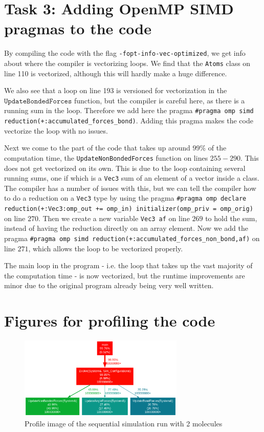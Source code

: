 \documentclass{article}
\begin{document}
\section{Task 3: Adding OpenMP SIMD pragmas to the code}
By compiling the code with the flag \texttt{-fopt-info-vec-optimized}, we get info about where the compiler is vectorizing loops. We find that the \texttt{Atoms} class on line 110 is vectorized, although this will hardly make a huge difference. 

We also see that a loop on line 193 is versioned for vectorization in the $\texttt{UpdateBondedForces}$ function, but the compiler is careful here, as there is a running sum in the loop. Therefore we add here the pragma \texttt{\#pragma omp simd reduction(+:accumulated\_forces\_bond)}. Adding this pragma makes the code vectorize the loop with no issues.

Next we come to the part of the code that takes up around $99\%$ of the computation time, the \texttt{UpdateNonBondedForces} function on lines $255-290$. This does not get vectorized on its own. This is due to the loop containing several running sums, one if which is a \texttt{Vec3} sum of an element of a vector inside a class. The compiler has a number of issues with this, but we can tell the compiler how to do a reduction on a \texttt{Vec3} type by using the pragma \texttt{\#pragma omp declare reduction(+:Vec3:omp\_out += omp\_in) initializer(omp\_priv = omp\_orig)} on line $270$. Then we create a new variable \texttt{Vec3 af} on line $269$ to hold the sum, instead of having the reduction directly on an array element. Now we add the pragma \texttt{\#pragma omp simd reduction(+:accumulated\_forces\_non\_bond,af)} on line $271$, which allows the loop to be vectorized properly. 

The main loop in the program - i.e. the loop that takes up the vast majority of the computation time - is now vectorized, but the runtime improvements are minor due to the original program already being very well written.
\appendix

\section*{Figures for profiling the code}
\begin{figure}
    \includegraphics[width=0.7\textwidth]{Images/seq_2mol_profile.png
    }
    \centering
    \caption{Profile image of the sequential simulation run with 2 molecules}
    \label{fig: seq profile 2 molecule}
\end{figure}
\end{document}
